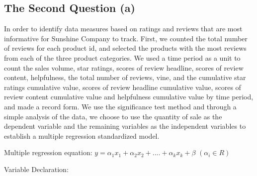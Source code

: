\documentclass[12pt]{article}
\begin{document}
\subsection{The Second Question (a)}
\quad\par\par
In order to identify data measures based on ratings and reviews that are most informative for Sunshine Company to track. First, we counted the total number of reviews for each product id, and selected the products with the most reviews from each of the three product categories. We used a time period as a unit to count the sales volume, star ratings, scores of review headline, scores of review content, helpfulness, the total number of reviews, vine, and the cumulative star ratings cumulative value, scores of review headline cumulative value, scores of review content cumulative value and helpfulness cumulative value by time period, and made a record form. We use the significance test method and through a simple analysis of the data, we choose to use the quantity of sale as the dependent variable and the remaining variables as the independent variables to establish a multiple regression standardized 
model.
\par
Multiple regression equation: $y=\alpha _1x_1+\alpha_2x_2+....+\alpha _kx_k+\beta \,\,\left( \alpha _i\in R \right)$
\par
Variable Declaration:
\par\quad\par\quad\par\quad\par\quad\par\quad\par\quad\par\quad\par\quad\par\quad\par\quad\par
\quad\par\quad\par\quad\par\quad\par\quad\par
\par\quad\par\quad\par\quad\par\quad\par\quad\par\quad\par\quad\par\quad\par\quad\par\quad\par
\end{document}
